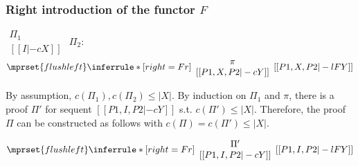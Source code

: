 \subsubsection{Right introduction of the functor $F$}
\begin{center}
  \scriptsize
  \begin{math}
    \begin{array}{c}
      \Pi_1 \\
      {[[I |-c X]]}
    \end{array}
  \end{math}
  \qquad\qquad
  $\Pi_2$:
  \begin{math}
    $$\mprset{flushleft}
    \inferrule* [right={\tiny Fr}] {
      {
        \begin{array}{c}
          \pi \\
          {[[P1, X, P2 |-c Y]]}
        \end{array}
      }
    }{[[P1, X, P2 |-l F Y]]}
  \end{math}
\end{center}
By assumption, $c(\Pi_1),c(\Pi_2)\leq |X|$. By induction on $\Pi_1$
and $\pi$, there is a proof $\Pi'$ for sequent $[[P1, I, P2 |-c Y]]$
s.t. $c(\Pi') \leq |X|$. Therefore, the proof $\Pi$ can be
constructed as follows with $c(\Pi) = c(\Pi') \leq |X|$.
\begin{center}
  \scriptsize
  \begin{math}
    $$\mprset{flushleft}
    \inferrule* [right={\tiny Fr}] {
      {
        \begin{array}{c}
          \Pi' \\
          {[[P1, I, P2 |-c Y]]}
        \end{array}
      }
    }{[[P1, I, P2 |-l F Y]]}
  \end{math}
\end{center}



